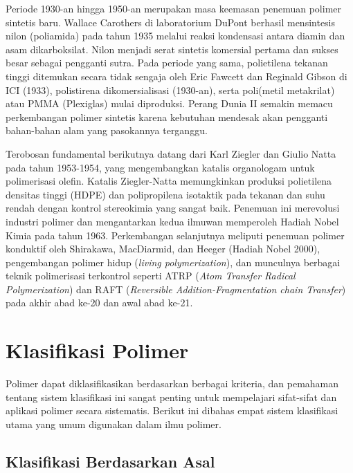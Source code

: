 \documentclass[12pt,a4paper,openany]{book}
\begin{document}
Periode 1930-an hingga 1950-an merupakan masa keemasan penemuan polimer sintetis baru. Wallace Carothers di laboratorium DuPont berhasil mensintesis nilon (poliamida) pada tahun 1935 melalui reaksi kondensasi antara diamin dan asam dikarboksilat. Nilon menjadi serat sintetis komersial pertama dan sukses besar sebagai pengganti sutra. Pada periode yang sama, polietilena tekanan tinggi ditemukan secara tidak sengaja oleh Eric Fawcett dan Reginald Gibson di ICI (1933), polistirena dikomersialisasi (1930-an), serta poli(metil metakrilat) atau PMMA (Plexiglas) mulai diproduksi. Perang Dunia II semakin memacu perkembangan polimer sintetis karena kebutuhan mendesak akan pengganti bahan-bahan alam yang pasokannya terganggu.

Terobosan fundamental berikutnya datang dari Karl Ziegler dan Giulio Natta pada tahun 1953-1954, yang mengembangkan katalis organologam untuk polimerisasi olefin. Katalis Ziegler-Natta memungkinkan produksi polietilena densitas tinggi (HDPE) dan polipropilena isotaktik pada tekanan dan suhu rendah dengan kontrol stereokimia yang sangat baik. Penemuan ini merevolusi industri polimer dan mengantarkan kedua ilmuwan memperoleh Hadiah Nobel Kimia pada tahun 1963. Perkembangan selanjutnya meliputi penemuan polimer konduktif oleh Shirakawa, MacDiarmid, dan Heeger (Hadiah Nobel 2000), pengembangan polimer hidup (\textit{living polymerization}), dan munculnya berbagai teknik polimerisasi terkontrol seperti ATRP (\textit{Atom Transfer Radical Polymerization}) dan RAFT (\textit{Reversible Addition-Fragmentation chain Transfer}) pada akhir abad ke-20 dan awal abad ke-21.


\section{Klasifikasi Polimer}

Polimer dapat diklasifikasikan berdasarkan berbagai kriteria, dan pemahaman tentang sistem klasifikasi ini sangat penting untuk mempelajari sifat-sifat dan aplikasi polimer secara sistematis. Berikut ini dibahas empat sistem klasifikasi utama yang umum digunakan dalam ilmu polimer.

\subsection{Klasifikasi Berdasarkan Asal}
\end{document}
